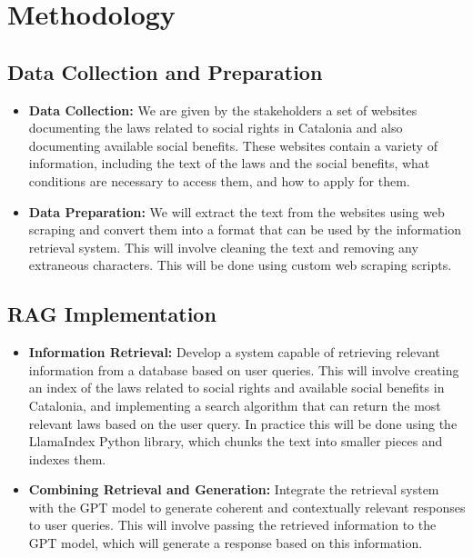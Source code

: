 \documentclass[a4paper,12pt,twoside]{ThesisStyle}
\begin{document}
\section{Methodology}

\subsection{Data Collection and Preparation}
\label{subsec:data}

\begin{itemize}
  \item \textbf{Data Collection:} We are given by the stakeholders a set of websites documenting the laws related to social rights in Catalonia and also documenting available social benefits. These websites contain a variety of information, including the text of the laws and the social benefits, what conditions are necessary to access them, and how to apply for them.
  \item \textbf{Data Preparation:} We will extract the text from the websites using web scraping and convert them into a format that can be used by the information retrieval system. This will involve cleaning the text and removing any extraneous characters. This will be done using custom web scraping scripts.
\end{itemize}

\subsection{RAG Implementation}
\label{subsec:rag-implementation}

\begin{itemize}
\item \textbf{Information Retrieval:} Develop a system capable of retrieving relevant information from a database based on user queries. This will involve creating an index of the laws related to social rights and available social benefits in Catalonia, and implementing a search algorithm that can return the most relevant laws based on the user query. In practice this will be done using the LlamaIndex Python library, which chunks the text into smaller pieces and indexes them.
  \item \textbf{Combining Retrieval and Generation:} Integrate the retrieval system with the GPT model to generate coherent and contextually relevant responses to user queries. This will involve passing the retrieved information to the GPT model, which will generate a response based on this information.
\end{itemize}
\end{document}
